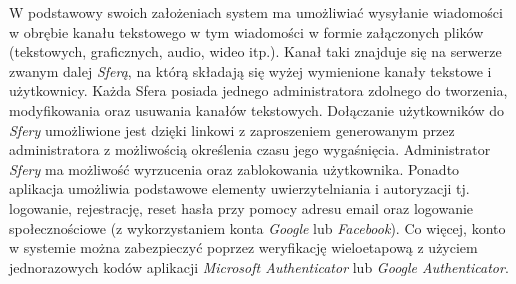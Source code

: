 
W podstawowy swoich założeniach system ma umożliwiać wysyłanie wiadomości w obrębie kanału tekstowego w tym wiadomości w
formie załączonych plików (tekstowych, graficznych, audio, wideo itp.). Kanał taki znajduje się na serwerze zwanym dalej
\textit{Sferą}, na którą składają się wyżej wymienione kanały tekstowe i użytkownicy. Każda Sfera posiada jednego
administratora zdolnego do tworzenia, modyfikowania oraz usuwania kanałów tekstowych. Dołączanie użytkowników do
\textit{Sfery} umożliwione jest dzięki linkowi z zaproszeniem generowanym przez administratora z możliwością określenia
czasu jego wygaśnięcia. Administrator \textit{Sfery} ma możliwość wyrzucenia oraz zablokowania użytkownika. Ponadto
aplikacja umożliwia podstawowe elementy uwierzytelniania i autoryzacji tj. logowanie, rejestrację, reset hasła przy
pomocy adresu email oraz logowanie społecznościowe (z wykorzystaniem konta \textit{Google} lub \textit{Facebook}). Co
więcej, konto w systemie można zabezpieczyć poprzez weryfikację wieloetapową z użyciem jednorazowych kodów aplikacji
\textit{Microsoft Authenticator} lub \textit{Google Authenticator}.

